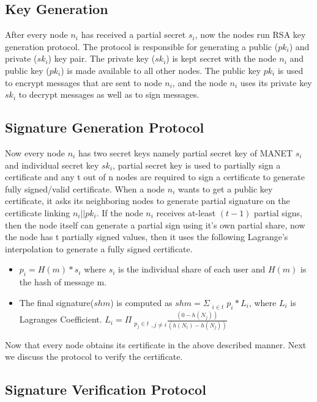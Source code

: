 \documentclass[11pt,a4paper]{llncs}
\begin{document}
\subsection{Key Generation}
After every node $n_i$ has received a partial secret $s_i$, now the nodes run RSA key generation protocol. The protocol is responsible for generating a public ($pk_i$) and private ($sk_i$) key pair. The private key ($sk_i$) is kept secret with the node $n_i$ and public key ($pk_i$) is made available to all other nodes. The public key $pk_i$ is used to encrypt messages that are sent to node $n_i$, and the node $n_i$ uses its private key $sk_i$ to decrypt messages as well as to sign messages.

%

\subsection{Signature Generation Protocol}
Now every node $n_i$ has two secret keys namely partial secret key of MANET $s_i$ and individual secret key $sk_i$, partial secret key is used to partially sign a certificate and any t out of n nodes are required to sign a certificate to generate fully signed/valid certificate. When a node $n_i$ wants to get a public key certificate, it asks its neighboring nodes to generate partial signature on the certificate linking $n_i$$||$$pk_i$. If the node $n_i$ receives at-least $(t-1)$ partial signs, then the node itself can generate a partial sign using it's own partial share, now the node has t partially signed values, then it uses the following Lagrange's interpolation to generate a fully signed certificate.

\begin{itemize}
\item $p_i = H(m)*s_i$ where $s_i$ is the individual share of each user and $H(m)$ is the hash of message m.
\item The final signature($shm$) is computed as 
 $ shm = \Sigma_{\substack{i \in t}} p_i*{L_i}$, where $L_i $ is Lagranges Coefficient.
 $L_i =\Pi_{\substack{p_j \in t},{j\neq i}}\frac{(0-h(N_j))}{(h(N_i)- h(N_j))}$
            
\end{itemize}
Now that every node obtains its certificate in the above described manner. Next we discuss the protocol to verify the certificate.

\subsection{Signature Verification Protocol}
\end{document}
